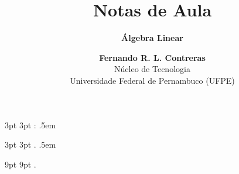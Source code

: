  {3pt}%
  {3pt}%
  {}%
  {}%
  {\itshape}%
  {:}%
  {.5em}%
  {}%

\theoremstyle{note}
\newtheorem{note}{Note}

  {3pt}%
  {3pt}%
  {\itshape}%
  {}%
  {\bfseries}%
  {.}%
  {.5em}%
  {}%

\theoremstyle{citing}
\newtheorem*{varthm}{}%

  {9pt}%
  {9pt}%
  {\itshape}%
  {}%
  {\bfseries}%
  {.}%
  {\newline}%
  {}%

\theoremstyle{break}
\newtheorem{bthm}{B-Theorem}

\theoremstyle{exercise}
\newtheorem{exer}{Exercise}

\swapnumbers
\theoremstyle{plain}
\newtheorem{thmsw}{Theorem}[section]
\newtheorem{propsw}{Proposition}

\let\lvert=|\let\rvert=|
\newcommand{\Ric}{\mathop{\mathrm{Ric}}\nolimits}

\addtolength{\textwidth}{8pt}

\title{ \textbf{Notas de Aula}}
\subtitle{\textbf{Álgebra Linear}}
\author{\textbf{Fernando R. L. Contreras}\\
	\large Núcleo de Tecnologia\\
	Universidade Federal de Pernambuco (UFPE)}


